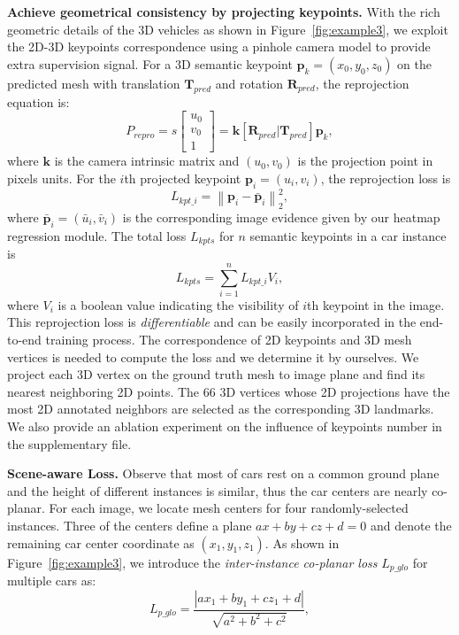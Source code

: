 \documentclass[runningheads]{llncs}
\newcommand{\bR}{\mathbf}
\begin{document}
\smallskip\noindent\textbf{Achieve geometrical consistency by projecting keypoints.}
With the rich geometric details of the 3D vehicles as shown in Figure~\ref{fig:example3}, we exploit the 2D-3D keypoints correspondence using a pinhole camera model to provide extra supervision signal. For a 3D semantic keypoint $\bR{p}_k=(x_0,y_0,z_0)$ on the predicted mesh with translation $\bR{T}_{pred}$ and rotation $\bR{R}_{pred}$, the reprojection equation is:
\begin{equation}
P_{repro}= s\begin{bmatrix}
u_0\\ 
v_0\\ 
1
\end{bmatrix} =\bR{k}[\bR{R}_{pred}|\bR{T}_{pred}]\bR{p}_k,
\end{equation}
where $\bR{k}$ is the camera intrinsic matrix and $(u_0,v_0)$ is the projection point in pixels units. 
For the $i$th projected keypoint $\bR{p}_{i} = (u_i,v_i)$, the reprojection loss is
\begin{equation}
L_{kpt\_i} = \left \| \bR{p}_i-\bR{\bar{p}}_{i} \right \|_2^2,
\end{equation}
where $\bR{\bar{p}}_{i} = (\bar{u}_{i},\bar{v}_{i})$ is the corresponding image evidence given by our heatmap regression module.
The total loss $L_{kpts}$ for $n$ semantic keypoints in a car instance is
\begin{equation}
L_{kpts}= \sum_{i=1}^{n}{L_{kpt\_i}V_i},
\end{equation}
where $V_i$ is a boolean value indicating the visibility of $i$th keypoint in the image. This reprojection loss is \textit{differentiable} and can be easily incorporated in the end-to-end training process. The correspondence of 2D keypoints and 3D mesh vertices is needed to compute the loss and we determine it by ourselves. We project each 3D vertex on the ground truth mesh to image plane and find its nearest neighboring 2D points. The 66 3D vertices whose 2D projections have the most 2D annotated neighbors are selected as the corresponding 3D landmarks. We also provide an ablation experiment on the influence of keypoints number in the supplementary file.

\smallskip\noindent\textbf{Scene-aware Loss.}
Observe that most of cars rest on a common ground plane and the height of different instances is similar, thus the car centers are nearly co-planar. For each image, we locate mesh centers for four randomly-selected instances. Three of the centers define a plane $ax+by+cz+d=0$ and denote the remaining car center coordinate as $(x_1,y_1,z_1)$. As shown in Figure~\ref{fig:example3}, we introduce the \textit{inter-instance co-planar loss} $L_{p\_{glo}}$ for multiple cars  as:
\begin{equation}
L_{p\_{glo}} =\frac{|ax_1+by_1+cz_1+d|}{\sqrt{a^2+b^2+c^2}},
\label{eq:eq3}
\end{equation}
\end{document}

